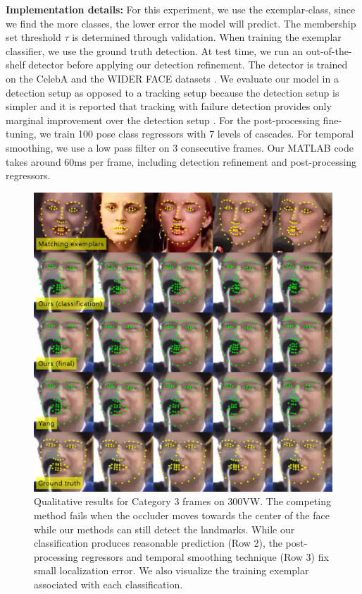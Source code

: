 \documentclass[letterpaper]{article} %
\begin{document}
{\bf Implementation details:}
For this experiment, we use the exemplar-class, since we find the more classes, the lower error the model will predict.
The membership set threshold $\tau$ is determined through validation. When training the exemplar classifier, we use the ground truth detection. At test time, we run an out-of-the-shelf detector \cite{Zhang2016SP} before applying our detection refinement. The detector is trained on the CelebA \cite{liu2015deep} and the WIDER FACE datasets \cite{yang2016wider}. We evaluate our model in a detection setup as opposed to a tracking setup because the detection setup is simpler and it is reported that tracking with failure detection provides only marginal improvement over the detection setup \cite{Chrysos2017ACP}. For the post-processing fine-tuning, we train 100 pose class regressors with 7 levels of cascades. For temporal smoothing, we use a low pass filter on 3 consecutive frames. Our MATLAB code takes around 60ms per frame, including detection refinement and post-processing regressors.

\begin{figure}[t]
\begin{center}
   \includegraphics[width=1\linewidth]{fig/300vw_vis.png}
\end{center}
   \caption{Qualitative results for Category 3 frames on 300VW. The competing method \cite{Yang2015FacialST} fails when the occluder moves towards the center of the face while our methods can still detect the landmarks. While our classification produces reasonable prediction (Row 2), the post-processing regressors and temporal smoothing technique (Row 3) fix small localization error. We also visualize the training exemplar associated with each classification.}
\label{fig:300vw_vis}
\end{figure}
\end{document}
